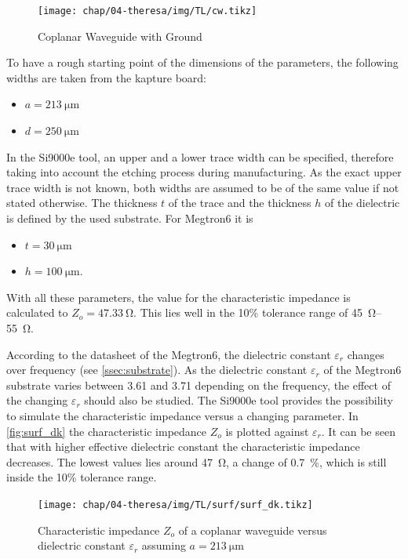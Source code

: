 \begin{figure}[!htbp]
	\centering
	\texttt{[image: chap/04-theresa/img/TL/cw.tikz]}
	\caption{Coplanar Waveguide with Ground}
	\label{fig:microstrip_geometry}
\end{figure}

To have a rough starting point of the dimensions of the parameters, the following widths are taken from the \gls{kapture} board:
\begin{itemize}
	\item $a = \SI{213}{\micro \meter}$
	\item $d = \SI{250}{\micro \meter}$
\end{itemize}
In the Si9000e tool, an upper and a lower trace width can be specified, therefore taking into account the etching process during manufacturing.
As the exact upper trace width is not known, both widths are assumed to be of the same value if not stated otherwise.
The thickness $t$ of the trace and the thickness $h$ of the dielectric is defined by the used substrate.
For Megtron6 it is 
\begin{itemize}
	\item $t = \SI{30}{\micro \meter}$
	\item $h = \SI{100}{\micro \meter}$.
\end{itemize}
With all these parameters, the value for the characteristic impedance is calculated to $Z_o = \SI{47.33}{\ohm}$.
This lies well in the 10\% tolerance range of \SIrange{45}{55}{\ohm}. 

According to the datasheet of the Megtron6, the dielectric constant $\varepsilon_r$ changes over frequency (see \autoref{ssec:substrate}).
As the dielectric constant $\varepsilon_r$ of the Megtron6 substrate varies between 3.61 and 3.71 depending on the frequency, the effect of the changing $\varepsilon_r$ should also be studied. 
The Si9000e tool provides the possibility to simulate the characteristic impedance versus a changing parameter.
In \autoref{fig:surf_dk} the characteristic impedance $Z_o$ is plotted against $\varepsilon_r$.
It can be seen that with higher effective dielectric constant the characteristic impedance decreases.
The lowest values lies around \SI{47}{\ohm}, a change of \SI{0.7}{\percent}, which is still inside the 10\% tolerance range.
\begin{figure}[tbh]
	\centering
	\texttt{[image: chap/04-theresa/img/TL/surf/surf\_dk.tikz]}
	\caption[CWG, $Z_o$ vs $\varepsilon_r$]{Characteristic impedance $Z_o$ of a coplanar waveguide versus dielectric constant $\varepsilon_r$ assuming $a = \SI{213}{\micro \meter}$}
	\label{fig:surf_dk}
\end{figure}

